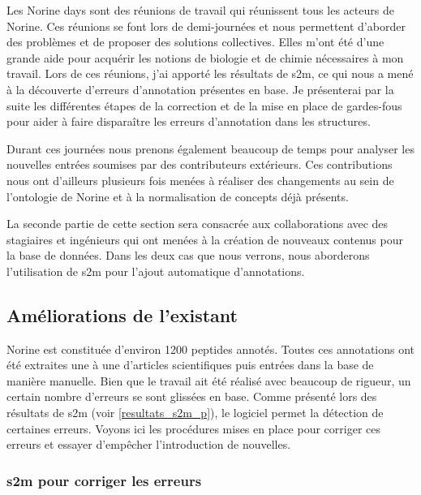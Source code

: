 Les Norine days sont des réunions de travail qui réunissent tous les acteurs de Norine.
Ces réunions se font lors de demi-journées et nous permettent d'aborder des problèmes et de proposer des solutions collectives.
Elles m'ont été d'une grande aide pour acquérir les notions de biologie et de chimie nécessaires à mon travail.
Lors de ces réunions, j'ai apporté les résultats de s2m, ce qui nous a mené à la découverte d'erreurs d'annotation présentes en base.
Je présenterai par la suite les différentes étapes de la correction et de la mise en place de gardes-fous pour aider à faire disparaître les erreurs d'annotation dans les structures.

Durant ces journées nous prenons également beaucoup de temps pour analyser les nouvelles entrées soumises par des contributeurs extérieurs.
Ces contributions nous ont d'ailleurs plusieurs fois menées à réaliser des changements au sein de l'ontologie de Norine et à la normalisation de concepts déjà présents.

La seconde partie de cette section sera consacrée aux collaborations avec des stagiaires et ingénieurs qui ont menées à la création de nouveaux contenus pour la base de données.
Dans les deux cas que nous verrons, nous aborderons l'utilisation de s2m pour l'ajout automatique d'annotations.


\subsection{Améliorations de l'existant}

Norine est constituée d'environ 1200 peptides annotés.
Toutes ces annotations ont été extraites une à une d'articles scientifiques puis entrées dans la base de manière manuelle.
Bien que le travail ait été réalisé avec beaucoup de rigueur, un certain nombre d'erreurs se sont glissées en base.
Comme présenté lors des résultats de s2m (voir \ref{resultats_s2m_p}), le logiciel permet la détection de certaines erreurs.
Voyons ici les procédures mises en place pour corriger ces erreurs et essayer d'empêcher l'introduction de nouvelles.


\subsubsection{s2m pour corriger les erreurs}

